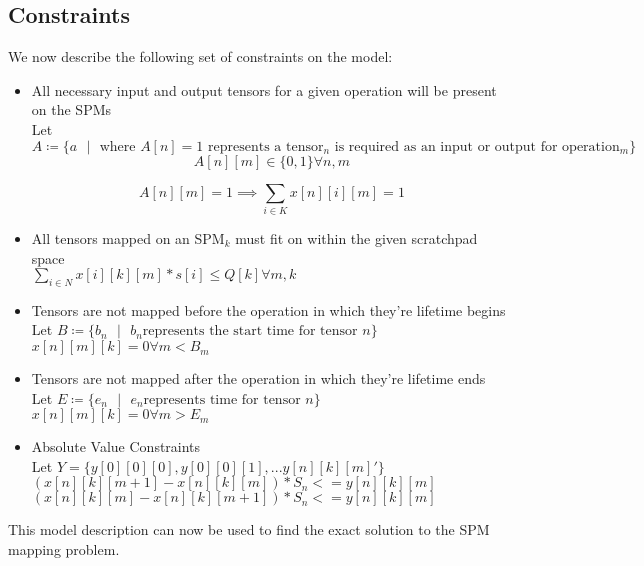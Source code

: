 \subsection{Constraints}
We now describe the following set of constraints on the model:
\begin{itemize}
	\item All necessary input and output tensors for a given operation will be present on the SPMs\\

		Let $A \coloneqq \{ a \text{ } | \text{ } \text{where } A[n] = 1\text{ represents a tensor$_n$ is required as an input or output for operation$_m$} \}$\\
		\[
			A[n][m] \in \{0, 1\} \forall n,m
		\]

		\[
			A[n][m] = 1 \implies \sum_{i \in K} x[n][i][m] = 1 
		\]

	\item All tensors mapped on an SPM$_k$ must fit on within the given scratchpad space\\

		$\sum_{i \in N} {x[i][k][m] * s[i]} \leq Q[k] \forall m,k$\\

	\item Tensors are not mapped before the operation in which they're lifetime begins \\

		Let $B \coloneqq \{ b_n \text{ } | \text{ }  b_n \text{represents the start time for tensor $n$}\}$ \\

		$x[n][m][k] = 0 \forall m < B_m$

	\item Tensors are not mapped after the operation in which they're lifetime ends \\

		Let $E \coloneqq \{ e_n \text{ } | \text{ }  e_n \text{represents time for tensor $n$}\}$ \\

		$x[n][m][k]= 0 \forall m > E_m$

	\item Absolute Value Constraints\\
		Let $Y = \{ y[0][0][0], y[0][0][1], ... y[n][k][m]\prime\}$\\
		$(x[n][k][m+1] - x[n][k][m]) * S_n <= y[n][k][m]$\\
		$(x[n][k][m] - x[n][k][m + 1]) * S_n <= y[n][k][m]$\\

\end{itemize}

This model description can now be used to find the exact solution to the SPM mapping problem.
